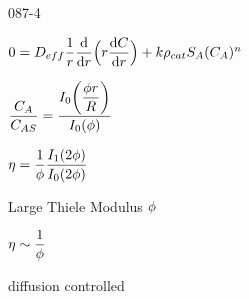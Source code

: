 \begin{mitframe}{087-4}
  
\begin{listone}  
	\item $0=\elecdisplace_{eff}\dfrac{1}{\pos}\dfrac{\mathrm{d}}{\mathrm{d}\pos}\Big(\pos\dfrac{\mathrm{d}\conc}{\mathrm{d}\pos}\Big)+\thermcond\dens_{cat}\entropy_{\helmholtz}(\conc_{\helmholtz})^n$
	\begin{listtwo}
        
        \item $\dfrac{\conc_{\helmholtz}}{\conc_{\helmholtz\entropy}}=\dfrac{\mominertia_0\bigg(\dfrac{\eleccoeff\pos}{\gasconst}\bigg)}{\mominertia_0(\eleccoeff)}$
            
        \item $\intrinsvisc=\dfrac{1}{\eleccoeff}\dfrac{\mominertia_1(2\eleccoeff)}{\mominertia_0(2\eleccoeff)}$
            
        \item Large Thiele Modulus $\eleccoeff$
            
        \begin{listthree}
                    
        	\item $\intrinsvisc\sim\dfrac{1}{\eleccoeff}$
                        
            \item diffusion controlled 
                        
		\end{listthree}
	\end{listtwo}
\end{listone}

\end{mitframe}